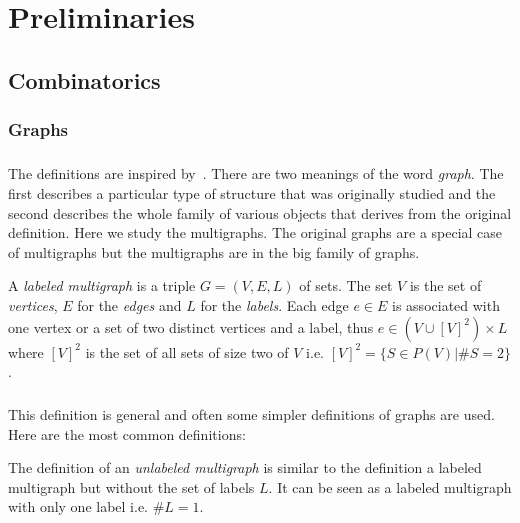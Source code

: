 \chapter{Preliminaries}
\label{Preliminaries}

\section{Combinatorics}
\subsection{Graphs}

\paragraph{}
The definitions are inspired by~\cite{diestel2017graph}. There are two meanings of the word \textit{graph}. The first  describes a particular type of structure that was originally studied and the second describes the whole family of various objects that derives from the original definition. Here we study the multigraphs. The original graphs are a special case of multigraphs but the multigraphs are in the big family of graphs.

\begin{definition}
  A \textit{labeled multigraph} is a triple $G = (V, E, L)$ of sets. The set $V$ is the set of \textit{vertices}, $E$ for the \textit{edges} and $L$ for the \textit{labels}. Each edge $e \in E$ is associated with one vertex or a set of two distinct vertices and a label, thus $e \in (V \cup [V]^2) \times L$ where $[V]^2$ is the set of all sets of size two of $V$ i.e. $[V]^2 = \{S \in P(V) | \#S = 2\}$.
\end{definition}

\paragraph{}
This definition is general and often some simpler definitions of graphs are used. Here are the most common definitions:

\begin{definition}
  The definition of an \textit{unlabeled multigraph} is similar to the definition a labeled multigraph but without the set of labels $L$. It can be seen as a labeled multigraph with only one label i.e. $\# L = 1$.
\end{definition}

